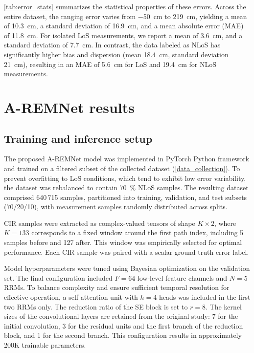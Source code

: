 \autoref{tab:error_stats} summarizes the statistical properties of these errors. Across the entire dataset, the ranging error varies from \SI{-50}{\centi\metre} to \SI{219}{\centi\metre}, yielding a mean of \SI{10.3}{\centi\metre}, a standard deviation of \SI{16.9}{\centi\metre}, and a mean absolute error (MAE) of \SI{11.8}{\centi\metre}. For isolated LoS measurements, we report a mean of \SI{3.6}{\centi\metre}, and a standard deviation of \SI{7.7}{\centi\metre}. In contrast, the data labeled as NLoS has significantly higher bias and dispersion (mean \SI{18.4}{\centi\metre}, standard deviation \SI{21}{\centi\metre}), resulting in an MAE of \SI{5.6}{\centi\metre} for LoS and \SI{19.4}{\centi\metre} for NLoS measurements.


\section{A-REMNet results}

\subsection{Training and inference setup}
The proposed A-REMNet model was implemented in PyTorch Python framework and trained on a filtered subset of the collected dataset (\autoref{data_collection}). To prevent overfitting to LoS conditions, which tend to exhibit low error variability, the dataset was rebalanced to contain \SI{70}{\percent} NLoS samples. The resulting dataset comprised 640\,715 samples, partitioned into training, validation, and test subsets (70/20/10), with measurement samples randomly distributed across splits.

CIR samples were extracted as complex-valued tensors of shape $K \times 2$, where $K = 133$ corresponds to a fixed window around the first path index, including 5 samples before and 127 after. This window was empirically selected for optimal performance. Each CIR sample was paired with a scalar ground truth error label.

Model hyperparameters were tuned using Bayesian optimization on the validation set. The final configuration included $F = 64$ low-level feature channels and $N = 5$ RRMs. To balance complexity and ensure sufficient temporal resolution for effective operation, a self-attention unit with $h = 4$ heads was included in the first two RRMs only. The reduction ratio of the SE block is set to $r = 8$. The kernel sizes of the convolutional layers are retained from the original study: 7 for the initial convolution, 3 for the residual units and the first branch of the reduction block, and 1 for the second branch. This configuration results in approximately 200K trainable parameters.

